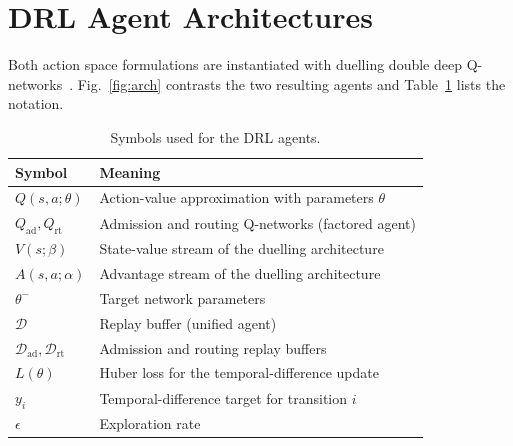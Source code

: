 \documentclass[10pt,journal,comsoc]{IEEEtran}
\begin{document}
\section{DRL Agent Architectures} \label{agents}
Both action space formulations are instantiated with duelling double deep
Q-networks~\cite{mnih2015human,vanhasselt2016double,wang2016dueling}.
Fig.~\ref{fig:arch} contrasts the two resulting agents and
Table~\ref{tab:drl_symbols} lists the notation.

\begin{table}[t]
\centering
\caption{Symbols used for the DRL agents.}
\label{tab:drl_symbols}
\renewcommand{\arraystretch}{1.15}
\begin{tabular}{>{\raggedright\arraybackslash}p{1.5cm} >{\raggedright\arraybackslash}p{6.4cm}}
\toprule
\textbf{Symbol} & \textbf{Meaning} \\
\midrule
$Q(s,a;\theta)$ & Action-value approximation with parameters $\theta$ \\
$Q_{\text{ad}},Q_{\text{rt}}$ & Admission and routing Q-networks (factored agent) \\
$V(s;\beta)$ & State-value stream of the duelling architecture \\
$A(s,a;\alpha)$ & Advantage stream of the duelling architecture \\
$\theta^{-}$ & Target network parameters \\
$\mathcal{D}$ & Replay buffer (unified agent) \\
$\mathcal{D}_{\text{ad}},\mathcal{D}_{\text{rt}}$ & Admission and routing replay buffers \\
$L(\theta)$ & Huber loss for the temporal-difference update \\
$y_i$ & Temporal-difference target for transition $i$ \\
$\epsilon$ & Exploration rate \\
\bottomrule
\end{tabular}
\end{table}
\end{document}
